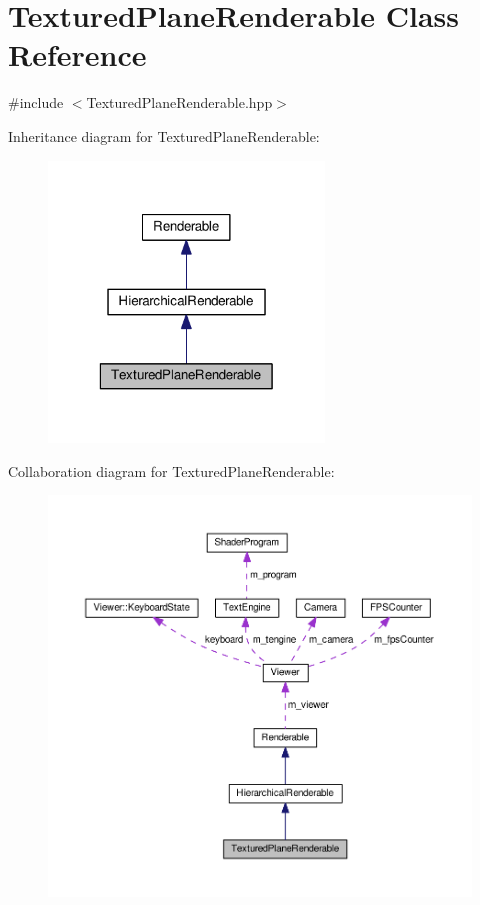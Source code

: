 \hypertarget{classTexturedPlaneRenderable}{\section{Textured\+Plane\+Renderable Class Reference}
\label{classTexturedPlaneRenderable}
}


{\ttfamily \#include $<$Textured\+Plane\+Renderable.\+hpp$>$}



Inheritance diagram for Textured\+Plane\+Renderable\+:\nopagebreak
\begin{figure}[H]
\begin{center}
\leavevmode
\includegraphics[width=208pt]{classTexturedPlaneRenderable__inherit__graph}
\end{center}
\end{figure}


Collaboration diagram for Textured\+Plane\+Renderable\+:\nopagebreak
\begin{figure}[H]
\begin{center}
\leavevmode
\includegraphics[width=350pt]{classTexturedPlaneRenderable__coll__graph}
\end{center}
\end{figure}
